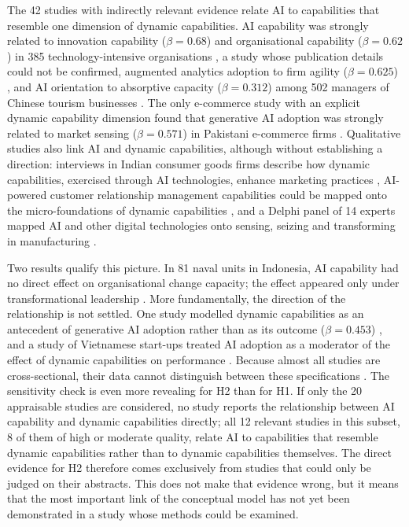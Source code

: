 The 42 studies with indirectly relevant evidence relate AI to capabilities that resemble one dimension of dynamic capabilities. AI capability was strongly related to innovation capability ($\beta = 0.68$) and organisational capability ($\beta = 0.62$) in 385 technology-intensive organisations \parencite{malik2021}, a study whose publication details could not be confirmed, augmented analytics adoption to firm agility ($\beta = 0.625$) \parencite{srahin2026}, and AI orientation to absorptive capacity ($\beta = 0.312$) among 502 managers of Chinese tourism businesses \parencite{li2026}. The only e-commerce study with an explicit dynamic capability dimension found that generative AI adoption was strongly related to market sensing ($\beta = 0.571$) in Pakistani e-commerce firms \parencite{noor2026}. Qualitative studies also link AI and dynamic capabilities, although without establishing a direction: interviews in Indian consumer goods firms describe how dynamic capabilities, exercised through AI technologies, enhance marketing practices \parencite{mukhopadhyay2024}, AI-powered customer relationship management capabilities could be mapped onto the micro-foundations of dynamic capabilities \parencite{alnofeli2025}, and a Delphi panel of 14 experts mapped AI and other digital technologies onto sensing, seizing and transforming in manufacturing \parencite{ghobakhloo2025}.

Two results qualify this picture. In 81 naval units in Indonesia, AI capability had no direct effect on organisational change capacity; the effect appeared only under transformational leadership \parencite{sofiyan2026}. More fundamentally, the direction of the relationship is not settled. One study modelled dynamic capabilities as an antecedent of generative AI adoption rather than as its outcome ($\beta = 0.453$) \parencite{deng2025}, and a study of Vietnamese start-ups treated AI adoption as a moderator of the effect of dynamic capabilities on performance \parencite{quoc2026}. Because almost all studies are cross-sectional, their data cannot distinguish between these specifications \parencite{rohrer2022}. The sensitivity check is even more revealing for H2 than for H1. If only the 20 appraisable studies are considered, no study reports the relationship between AI capability and dynamic capabilities directly; all 12 relevant studies in this subset, 8 of them of high or moderate quality, relate AI to capabilities that resemble dynamic capabilities rather than to dynamic capabilities themselves. The direct evidence for H2 therefore comes exclusively from studies that could only be judged on their abstracts. This does not make that evidence wrong, but it means that the most important link of the conceptual model has not yet been demonstrated in a study whose methods could be examined.

